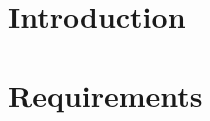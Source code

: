 \documentclass{article}
\begin{document}




\section{Introduction}


\section{Requirements}

\end{document}
